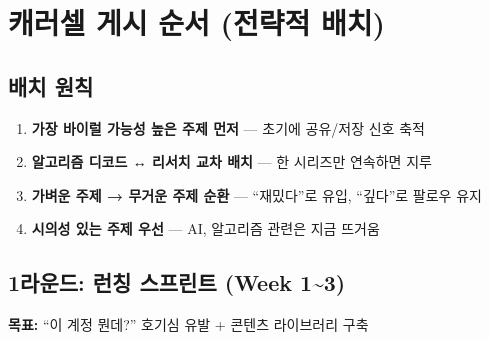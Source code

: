 \documentclass[11pt, a4paper]{article}
\begin{document}

\section{캐러셀 게시 순서 (전략적 배치)}

\subsection{배치 원칙}

\begin{enumerate}[leftmargin=2em]
  \item \textbf{가장 바이럴 가능성 높은 주제 먼저} — 초기에 공유/저장 신호 축적
  \item \textbf{알고리즘 디코드 ↔ 리서치 교차 배치} — 한 시리즈만 연속하면 지루
  \item \textbf{가벼운 주제 → 무거운 주제 순환} — ``재밌다''로 유입, ``깊다''로 팔로우 유지
  \item \textbf{시의성 있는 주제 우선} — AI, 알고리즘 관련은 지금 뜨거움
\end{enumerate}

\subsection{1라운드: 런칭 스프린트 (Week 1\textasciitilde 3)}

\begin{tcolorbox}[colback=lightgreen, colframe=accent]
\textbf{목표:} ``이 계정 뭔데?'' 호기심 유발 + 콘텐츠 라이브러리 구축
\end{tcolorbox}

\vspace{0.5em}
\end{document}
